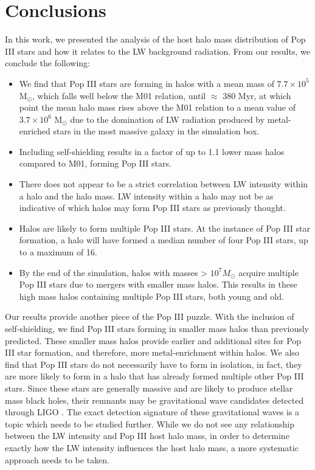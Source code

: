 \documentclass[a4paper,fleqn,usenatbib]{mnras}
\begin{document}
\section{Conclusions}
In this work, we presented the analysis of the host halo mass distribution of Pop III stars and how it relates to the LW background radiation. From our results, we conclude the following: 

\begin{itemize}
	\item We find that Pop III stars are forming in halos with a mean mass of $7.7 \times 10^{5}$ M$_{\odot}$, which falls well below the M01 relation, until $\approx$ 380 Myr, at which point the mean halo mass rises above the M01 relation to a mean value of $3.7 \times 10^{6}$ M$_{\odot}$ due to the domination of LW radiation produced by metal-enriched stars in the most massive galaxy in the simulation box.
	\item Including \hh{} self-shielding results in a factor of up to 1.1 lower mass halos compared to M01, forming Pop III stars.
	\item There does not appear to be a strict correlation between LW intensity within a halo and the halo mass. LW intensity within a halo may not be as indicative of which halos may form Pop III stars as previously thought.
	\item Halos are likely to form multiple Pop III stars. At the instance of Pop III star formation, a halo will have formed a median number of four Pop III stars, up to a maximum of 16.
	\item By the end of the simulation, halos with masses > $10^{7} M_{\odot}$ acquire multiple Pop III stars due to mergers with smaller mass halos. This results in these high mass halos containing multiple Pop III stars, both young and old. 
\end{itemize}

Our results provide another piece of the Pop III puzzle. With the inclusion of \hh{} self-shielding, we find Pop III stars forming in smaller mass halos than previously predicted. These smaller mass halos provide earlier and additional sites for Pop III star formation, and therefore, more metal-enrichment within halos. We also find that Pop III stars do not necessarily have to form in isolation, in fact, they are more likely to form in a halo that has already formed multiple other Pop III stars. Since these stars are generally massive and are likely to produce stellar mass black holes, their remnants may be gravitational wave candidates detected through LIGO \citep{Hartwig16}. The exact detection signature of these gravitational waves is a topic which needs to be studied further. While we do not see any relationship between the LW intensity and Pop III host halo mass,  in order to determine exactly how the LW intensity influences the host halo mass, a more systematic approach needs to be taken. 
\end{document}
